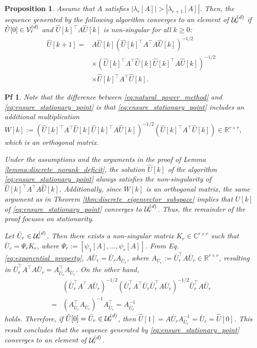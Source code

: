 \documentclass[10pt,a4paper]{amsart}
\newtheorem{prop}{Proposition}
\newtheorem{pf}{Pf}
\begin{document}
\begin{prop}\label{prop:ensure_stationary_point}
Assume that $A$ satisfies $| \lambda _{r}[A] | > | \lambda _{r+1}[A] |$. Then, the sequence generated by the following algorithm converges to an element of $\mathcal{U}_{r}^{\rm (d)}$ if $\hat{U}[0] \in \mathcal{V}_{r} ^{\rm (d)}$ and $\hat{U}[k]^{\top}A \hat{U}[k]$ is non-singular for all $k\geq 0$:
\begin{align}
    \hat{U}[k+1] =& A \hat{U}[k] (\hat{U}[k]^{\top} A^{\top} A \hat{U}[k]) ^{-1/2} 
    \nonumber \\
    & \times (\hat{U}[k]^{\top} A^{\top} \hat{U}[k] \hat{U}[k]^{\top} A \hat{U}[k]) ^{-1/2} 
    \nonumber \\ & \times
    \hat{U}[k]^{\top} A^{\top} \hat{U}[k].
    \label{eq:ensure_stationary_point}
\end{align}
\end{prop}

\begin{pf}
Note that the difference between \eqref{eq:natural_power_method} and \eqref{eq:ensure_stationary_point} is that \eqref{eq:ensure_stationary_point} includes an additional multiplication $W[k] := (\hat{U}[k]^{\top} A^{\top} \hat{U}[k] \hat{U}[k]^{\top} A \hat{U}[k]) ^{-1/2} (\hat{U}[k]^{\top} A^{\top} \hat{U}[k]) \in \mathbb{R}^{r\times r}$, which is an orthogonal matrix.

Under the assumptions and the arguments in the proof of Lemma \ref{lemma:discrete_norank_deficit}, the solution $\hat{U}[k]$ of the algorithm \eqref{eq:ensure_stationary_point} always satisfies the non-singularity of $\hat{U}[k]^{\top} A^{\top} A \hat{U}[k]$.  
Additionally, since $W[k]$ is an orthogonal matrix, the same argument as in Theorem \ref{thm:discrete_eigenvector_subspace} implies that $U[k]$ of \eqref{eq:ensure_stationary_point} converges to $\mathcal{U}_{r}^{\rm (d)}$. 
Thus, the remainder of the proof focuses on stationarity. 

Let $\bar{U}_{r} \in \mathcal{U}_{r}^{\rm (d)}$. Then there exists a non-singular matrix $K_{r} \in \mathbb{C}^{r\times r}$ such that $\bar{U}_{r} = \Psi _{r} K_{r}$, where $\Psi _{r} := [\psi _{1}[A] ,\dots ,\psi _{r}[A]]$.  
From Eq. \eqref{eq:exponential_property}, $A \bar{U} _{r} = \bar{U}_{r} A_{\bar{U}_{r}}$, where $A_{\bar{U}_{r}} := \bar{U}_{r}^{\top}A\bar{U}_{r} \in \mathbb{R}^{r\times r}$, resulting in $\bar{U}_{r}^{\top} A^{\top} A \bar{U}_{r} = A_{\bar{U}_{r}}^{\top} A_{\bar{U}_{r}}$. 
On the other hand,
\begin{align*}
    &(\bar{U}_{r}^{\top} A^{\top} A \bar{U}_{r} ) ^{-1/2} 
    (\bar{U}_{r}^{\top} A^{\top} \bar{U}_{r} \bar{U}_{r}^{\top} A \bar{U}_{r} ) ^{-1/2} 
    \bar{U}_{r}^{\top} A \bar{U}_{r}
    \\
    =&
    (A_{\bar{U}_{r}}^{\top} A_{\bar{U}_{r}}) ^{-1} A_{\bar{U}_{r}}^{\top} = A_{\bar{U}_{r}}^{-1}
\end{align*}
holds. 
Therefore, if $\hat{U}[0] = \bar{U}_{r}  \in \mathcal{U}_{r}^{\rm (d)}$, then
    $\hat{U}[1] = A\bar{U}_{r} A_{\bar{U}_{r}}^{-1} = \bar{U}_{r} = \hat{U}[0]$.
This result concludes that the sequence generated by \eqref{eq:ensure_stationary_point} converges to an element of $\mathcal{U}_{r}^{\rm (d)}$.  
\end{pf}
\end{document}
